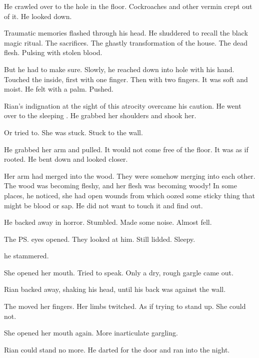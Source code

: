He crawled over to the hole in the floor. 
Cockroaches and other vermin crept out of it. 
He looked down. 

Traumatic memories flashed through his head. 
He shuddered to recall the black magic ritual. 
The \human{} sacrifices. 
The ghastly transformation of the house. 
The dead flesh. 
Pulsing with stolen blood. 

But he had to make sure. 
Slowly, he reached down into hole with his hand. 
Touched the inside, first with one finger. 
Then with two fingers. 
It was soft and moist. 
He felt with a palm. 
Pushed. 

Rian's indignation at the sight of this atrocity overcame his caution. 
He went over to the sleeping \sphyle. 
He grabbed her shoulders and shook her.

Or tried to. 
She was stuck. 
Stuck to the wall. 

He grabbed her arm and pulled. 
It would not come free of the floor. 
It was as if rooted. 
He bent down and looked closer. 

Her arm had merged into the wood. 
They were somehow merging into each other. 
The wood was becoming fleshy, and her flesh was becoming woody! 
In some places, he noticed, she had open wounds from which oozed some sticky thing that might be blood or sap. 
He did not want to touch it and find out. 

He backed away in horror. 
Stumbled. 
Made some noise. 
Almost fell. 

The \ps{\sphyle} eyes opened. 
They looked at him. 
Still lidded. 
Sleepy. 

 he stammered. 

She opened her mouth. 
Tried to speak. 
Only a dry, rough gargle came out. 

Rian backed away, shaking his head, until his back was against the wall. 

The \sphyle{} moved her fingers. 
Her limbs twitched. 
As if trying to stand up. 
She could not. 

She opened her mouth again. 
More inarticulate gargling. 

Rian could stand no more. 
He darted for the door and ran into the night. 









